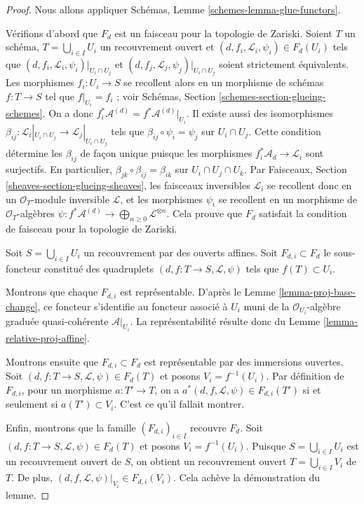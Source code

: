 \begin{proof}
Nous allons appliquer Schémas, Lemme \ref{schemes-lemma-glue-functors}.

\medskip\noindent
Vérifions d'abord que $F_d$ est un faisceau pour la topologie de Zariski.
Soient $T$ un schéma, $T = \bigcup_{i \in I} U_i$ un recouvrement ouvert et
$(d, f_i, \mathcal{L}_i, \psi_i) \in F_d(U_i)$ tels que
$(d, f_i, \mathcal{L}_i, \psi_i)|_{U_i \cap U_j}$ et
$(d, f_j, \mathcal{L}_j, \psi_j)|_{U_i \cap U_j}$ soient strictement
équivalents. Les morphismes $f_i : U_i \to S$ se recollent alors en un
morphisme de schémas $f : T \to S$ tel que $f|_{U_i} = f_i$ ; voir
Schémas, Section \ref{schemes-section-glueing-schemes}.
On a donc $f_i^*\mathcal{A}^{(d)} = f^*\mathcal{A}^{(d)}|_{U_i}$.
Il existe aussi des isomorphismes
$\beta_{ij} : \mathcal{L}_i|_{U_i \cap U_j} \to \mathcal{L}_j|_{U_i \cap U_j}$
tels que $\beta_{ij} \circ \psi_i = \psi_j$ sur $U_i \cap U_j$.
Cette condition détermine les $\beta_{ij}$ de façon unique puisque les
morphismes $f_i^*\mathcal{A}_d \to \mathcal{L}_i$ sont surjectifs.
En particulier, $\beta_{jk} \circ \beta_{ij} = \beta_{ik}$ sur
$U_i \cap U_j \cap U_k$. Par Faisceaux,
Section \ref{sheaves-section-glueing-sheaves}, les faisceaux inversibles
$\mathcal{L}_i$ se recollent donc en un $\mathcal{O}_T$-module inversible
$\mathcal{L}$, et les morphismes $\psi_i$ se recollent en un morphisme de
$\mathcal{O}_T$-algèbres
$\psi : f^*\mathcal{A}^{(d)} \to \bigoplus_{n \geq 0} \mathcal{L}^{\otimes n}$.
Cela prouve que $F_d$ satisfait la condition de faisceau pour la topologie
de Zariski.

\medskip\noindent
Soit $S = \bigcup_{i \in I} U_i$ un recouvrement par des ouverts affines.
Soit $F_{d, i} \subset F_d$ le sous-foncteur constitué des quadruplets
$(d, f : T \to S, \mathcal{L}, \psi)$ tels que $f(T) \subset U_i$.

\medskip\noindent
Montrons que chaque $F_{d, i}$ est représentable. D'après le
Lemme \ref{lemma-proj-base-change}, ce foncteur s'identifie au foncteur
associé à $U_i$ muni de la $\mathcal{O}_{U_i}$-algèbre graduée
quasi-cohérente $\mathcal{A}|_{U_i}$. La représentabilité résulte donc du
Lemme \ref{lemma-relative-proj-affine}.

\medskip\noindent
Montrons ensuite que $F_{d, i} \subset F_d$ est représentable par des
immersions ouvertes. Soit
$(d, f : T \to S, \mathcal{L}, \psi) \in F_d(T)$ et posons
$V_i = f^{-1}(U_i)$. Par définition de $F_{d, i}$, pour un morphisme
$a : T' \to T$, on a
$a^*(d, f, \mathcal{L}, \psi) \in F_{d, i}(T')$ si et seulement si
$a(T') \subset V_i$. C'est ce qu'il fallait montrer.

\medskip\noindent
Enfin, montrons que la famille $(F_{d, i})_{i \in I}$ recouvre $F_d$.
Soit $(d, f : T \to S, \mathcal{L}, \psi) \in F_d(T)$ et posons
$V_i = f^{-1}(U_i)$. Puisque $S = \bigcup_{i \in I} U_i$ est un
recouvrement ouvert de $S$, on obtient un recouvrement ouvert
$T = \bigcup_{i \in I} V_i$ de $T$.
De plus, $(d, f, \mathcal{L}, \psi)|_{V_i} \in F_{d, i}(V_i)$.
Cela achève la démonstration du lemme.
\end{proof}

